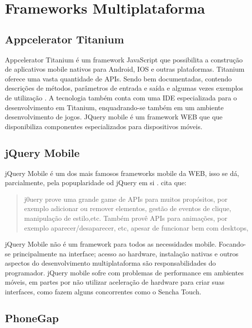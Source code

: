 \section{Frameworks Multiplataforma}

\subsection{Appcelerator Titanium}

Appcelerator Titanium é um framework JavaScript que possibilita a
construção de aplicativos mobile nativos para Android, IOS e outras
plataformas. Titanium oferece uma vasta quantidade de APIs. Sendo
bem documentadas, contendo descrições de métodos, parâmetros de
entrada e saída e algumas vezes exemplos de utilização \autocite[pp.
2]{crossPlatformAppsAnimations}. A tecnologia também conta com uma IDE
especializada para o desenvolvimento em Titanium, enquadrando-se também
em um ambiente desenvolvimento de jogos. JQuery mobile é um framework
WEB que que disponibiliza componentes especializados para dispositivos
móveis.

\subsection{jQuery Mobile}
jQuery Mobile é um dos mais famosos frameworks mobile da WEB, isso 
se dá, parcialmente, pela popuplaridade od jQuery em si \autocite[pp. 14]{viabilityBusinessApplications}.
\autocite[pp. 2]{crossPlatformAppsAnimations} cita que:
\begin{quote}
j0uery prove uma grande game de APIs para muitos propósitos, por
exemplo adicionar ou remover elementos, gestão de eventos de clique,
manipulação de estilo,etc. Também provê APIs para animações, por
exemplo aparecer/desaparecer, etc, apesar de funcionar bem com desktops,
\end{quote}

jQuery Mobile não é um framework para todos as necessidades mobile.
Focando-se principalmente na interface; acesso ao hardware, instalação
nativas e outros aspectos do desenvolvimento multiplataforma
são responsabilidades do programador. jQuery mobile sofre com
problemas de performance em ambientes móveis, em partes por não
utilizar aceleração de hardware para criar suas interfaces,
como fazem alguns concorrentes como o Sencha Touch\autocite[pp.
14]{viabilityBusinessApplications}.

\subsection{PhoneGap}

